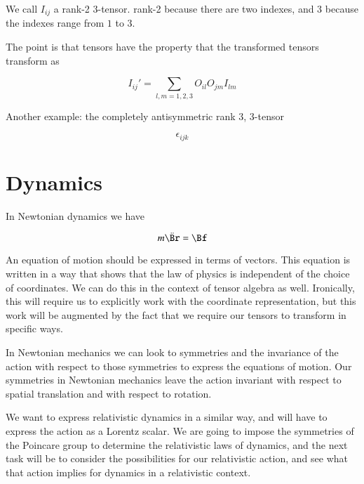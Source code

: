 We call $I_{ij}$ a rank-2 3-tensor.  rank-2 because there are two indexes, and 3 because the indexes range from $1$ to $3$.

The point is that tensors have the property that the transformed tensors transform as

\begin{equation}\label{eqn:relativisticElectrodynamicsL6:230}
I_{ij}' = \sum_{l, m = 1,2,3} O_{il} O_{jm} I_{lm}
\end{equation}

Another example: the completely antisymmetric rank 3, 3-tensor

\begin{equation}\label{eqn:relativisticElectrodynamicsL6:240}
\epsilon_{ijk}
\end{equation}

\section{Dynamics}

In Newtonian dynamics we have 

\begin{equation}\label{eqn:relativisticElectrodynamicsL6:250}
m \ddot{\Br} = \Bf
\end{equation}

An equation of motion should be expressed in terms of vectors.  This equation is written in a way that shows that the law of physics is independent of the choice of coordinates.  We can do this in the context of tensor algebra as well.  Ironically, this will require us to explicitly work with the coordinate representation, but this work will be augmented by the fact that we require our tensors to transform in specific ways.

In Newtonian mechanics we can look to symmetries and the invariance of the action with respect to those symmetries to express the equations of motion.  Our symmetries in Newtonian mechanics leave the action invariant with respect to spatial translation and with respect to rotation.

We want to express relativistic dynamics in a similar way, and will have to express the action as a Lorentz scalar.  We are going to impose the symmetries of the Poincare group to determine the relativistic laws of dynamics, and the next task will be to consider the possibilities for our relativistic action, and see what that action implies for dynamics in a relativistic context.

\EndArticle
